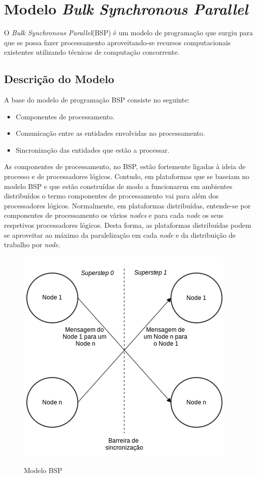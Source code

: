 \chapter{Modelo \textit{Bulk Synchronous Parallel}}

O \textit{Bulk Synchronous Parallel}(BSP) é um modelo de programação que 
surgiu para que se possa fazer processamento aproveitando-se recursos 
computacionais existentes utilizando técnicas de computação concorrente.

\section{Descrição do Modelo}

A base do modelo de programação BSP consiste no seguinte:
\begin{itemize} 
 \item Componentes de processamento.
 \item Comunicação entre as entidades envolvidas no processamento.
 \item Sincronização das entidades que estão a processar.
\end{itemize}

As componentes de processamento, no BSP, estão fortemente ligadas à ideia de 
processo e de processadores lógicos. Contudo, em plataformas que se baseiam no 
modelo BSP e que estão construídas de modo a funcionarem em ambientes 
distribuídos o termo componentes de processamento vai para além dos 
processadores lógicos. Normalmente, em plataformas distribuídas, entende-se por 
componentes de processamento os vários \textit{nodes} e para cada \textit{node} 
os seus respetivos processadores lógicos. Desta forma, as plataformas 
distribuídas podem se aproveitar ao máximo da paralelização em cada 
\textit{node} e da distribuição de trabalho por \textit{node}.

\begin{figure}[H]
 \caption{Modelo BSP}
 \includegraphics{bspmodel.png}
 \label{fig:bspmodel}
\end{figure}

